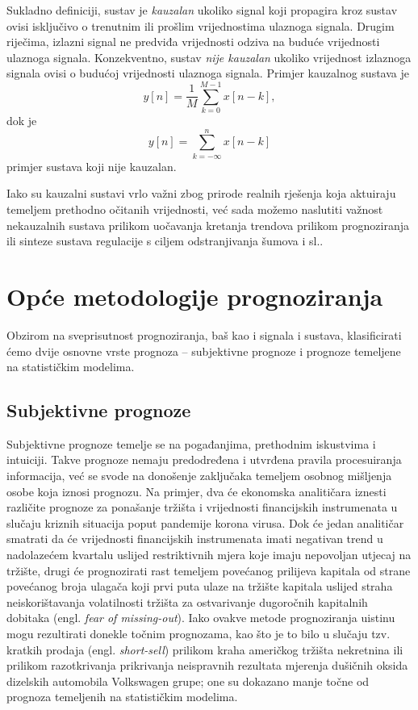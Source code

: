 \documentclass[a4paper,12pt,oneside]{memoir}
\newcommand{\kauzalni}{y[n]=\frac{1}{M}\displaystyle\sum_{k=0}^{M-1 }x[n-k]}
\newcommand{\nekauzalni}{y[n]=\displaystyle\sum_{k=-\infty}^{n}x[n-k]}
\begin{document}
                Sukladno definiciji, sustav je \textit{kauzalan} ukoliko signal koji propagira kroz sustav ovisi isključivo o trenutnim ili prošlim vrijednostima ulaznoga signala. Drugim riječima, izlazni signal ne predviđa vrijednosti odziva na buduće vrijednosti ulaznoga signala. Konzekventno, sustav \textit{nije kauzalan} ukoliko vrijednost izlaznoga signala ovisi o budućoj vrijednosti ulaznoga signala. Primjer kauzalnog sustava je
                \begin{equation}
                    \kauzalni,
                \end{equation}
                dok je
                \begin{equation}
                    \nekauzalni
                \end{equation}
                primjer sustava koji nije kauzalan.

                Iako su kauzalni sustavi vrlo važni zbog prirode realnih rješenja koja aktuiraju temeljem prethodno očitanih vrijednosti, već sada možemo naslutiti važnost nekauzalnih sustava prilikom uočavanja kretanja trendova prilikom prognoziranja ili sinteze sustava regulacije s ciljem odstranjivanja šumova i sl..

    \chapter{Opće metodologije prognoziranja}
        Obzirom na sveprisutnost prognoziranja, baš kao i signala i sustava, klasificirati ćemo dvije osnovne vrste prognoza -- subjektivne prognoze i prognoze temeljene na statističkim modelima.\cite{Holden}

        \section{Subjektivne prognoze}
            Subjektivne prognoze temelje se na pogađanjima, prethodnim iskustvima i intuiciji. Takve prognoze nemaju predodređena i utvrđena pravila procesuiranja informacija, već se svode na donošenje zaključaka temeljem osobnog mišljenja osobe koja iznosi prognozu. Na primjer, dva će ekonomska analitičara iznesti različite prognoze za ponašanje tržišta i vrijednosti financijskih instrumenata u slučaju kriznih situacija poput pandemije korona virusa. Dok će jedan analitičar smatrati da će vrijednosti financijskih instrumenata imati negativan trend u nadolazećem kvartalu uslijed restriktivnih mjera koje imaju nepovoljan utjecaj na tržište, drugi će prognozirati rast temeljem povećanog prilijeva kapitala od strane povećanog broja ulagača koji prvi puta ulaze na tržište kapitala uslijed straha neiskorištavanja volatilnosti tržišta za ostvarivanje dugoročnih kapitalnih dobitaka (engl. \textit{fear of missing-out}). Iako ovakve metode prognoziranja uistinu mogu rezultirati donekle točnim prognozama, kao što je to bilo u slučaju tzv. kratkih prodaja (engl. \textit{short-sell}) prilikom kraha američkog tržišta nekretnina ili prilikom razotkrivanja prikrivanja neispravnih rezultata mjerenja dušičnih oksida dizelskih automobila Volkswagen grupe; one su dokazano manje točne od prognoza temeljenih na statističkim modelima.
\end{document}
